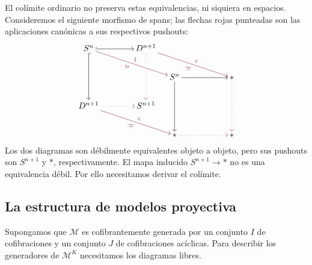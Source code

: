 \begin{ejem}
El colímite ordinario no preserva estas equivalencias, ni siquiera en espacios. Consideremos el siguiente morfismo de spans; las flechas rojas punteadas son las aplicaciones canónicas a sus respectivos pushouts:
\[
\begin{tikzcd}[column sep={12mm,between origins},
  row sep={12mm,between origins},
  cells={nodes={inner sep=2pt}}]
S^n \arrow[dd,hook]
& & D^{n+1} & & &\\
& & & S^n \arrow[rr] \arrow[dd] & & *\\
D^{n+1} & & S^{n+1} & & &\\
& & & * & & *
\arrow[from=1-3,to=3-3,rojoDiagramaCIMAT,dotted]
\arrow[from=3-1,to=3-3,rojoDiagramaCIMAT,dotted]
\arrow[from=2-6,to=4-6,rojoDiagramaCIMAT,dotted]
\arrow[from=4-4,to=4-6,rojoDiagramaCIMAT,dotted]
\arrow[from=1-1,to=2-4,rojoDiagramaCIMAT,crossing over,"1"{pos=.5},"\simeq"'{pos=.5}]
\arrow[from=1-3,to=2-6,rojoDiagramaCIMAT,"c"{pos=.5},"\simeq"'{pos=.5}]
\arrow[from=3-1,to=4-4,rojoDiagramaCIMAT,"c"{pos=.5},"\simeq"'{pos=.5}]
\arrow[from=1-1,to=1-3,hook]
\end{tikzcd}
\]
Los dos diagramas son débilmente equivalentes objeto a objeto, pero sus pushouts son $S^{n+1}$ y $*$, respectivamente. El mapa inducido $S^{n+1}\to *$ no es una equivalencia débil. Por ello necesitamos derivar el colímite.
\end{ejem}

\subsection{La estructura de modelos proyectiva}

Supongamos que $\mathcal M$ es cofibrantemente generada por un conjunto $I$ de cofibraciones y un conjunto $J$ de cofibraciones acíclicas. Para describir los generadores de $\mathcal M^K$ necesitamos los diagramas libres.


